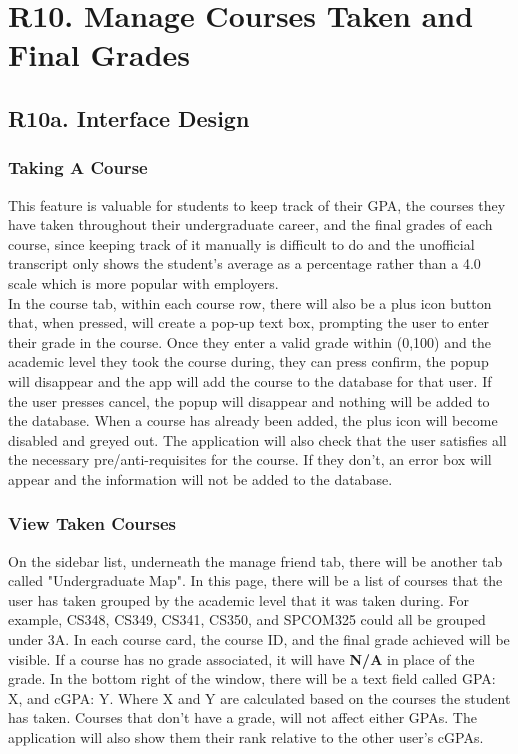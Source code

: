 \documentclass[12pt, a4paper]{article}
\begin{document}
\section*{R10. Manage Courses Taken and Final Grades}
\label{sec:R10}
\subsection*{R10a. Interface Design}
\subsubsection*{Taking A Course}
This feature is valuable for students to keep track of their GPA, the courses they have taken throughout their undergraduate career, and the final grades of each course, since keeping track of it manually is difficult to do and the unofficial transcript only shows the student's average as a percentage rather than a 4.0 scale which is more popular with employers.\\

In the course tab, within each course row, there will also be a plus icon button that, when pressed, will create a pop-up text box, prompting the user to enter their grade in the course. Once they enter a valid grade within (0,100) and the academic level they took the course during, they can press confirm, the popup will disappear and the app will add the course to the database for that user. If the user presses cancel, the popup will disappear and nothing will be added to the database. When a course has already been added, the plus icon will become disabled and greyed out. The application will also check that the user satisfies all the necessary pre/anti-requisites for the course. If they don't, an error box will appear and the information will not be added to the database.
\subsubsection*{View Taken Courses}
On the sidebar list, underneath the manage friend tab, there will be another tab called "Undergraduate Map". In this page, there will be a list of courses that the user has taken grouped by the academic level that it was taken during. For example, CS348, CS349, CS341, CS350, and SPCOM325 could all be grouped under 3A. In each course card, the course ID, and the final grade achieved will be visible. If a course has no grade associated, it will have \textbf{N/A} in place of the grade. In the bottom right of the window, there will be a text field called GPA: X, and cGPA: Y. Where X and Y are calculated based on the courses the student has taken. Courses that don't have a grade, will not affect either GPAs. The application will also show them their rank relative to the other user's cGPAs.
\end{document}

